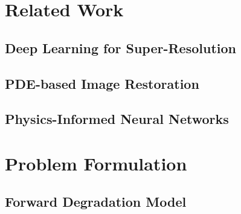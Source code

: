 \documentclass[conference]{IEEEtran}
\begin{document}
\section{Related Work}

\subsection{Deep Learning for Super-Resolution}

\subsection{PDE-based Image Restoration}

\subsection{Physics-Informed Neural Networks}


\section{Problem Formulation}

\subsection{Forward Degradation Model}
\end{document}
